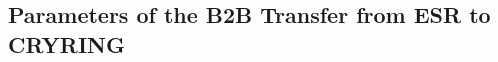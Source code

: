 \begin{longtable*}{ | c | c | c | c | }
    \end{longtable*}
 
 


  
\subsection{Parameters of the B2B Transfer from ESR to CRYRING}
\label{tab:ESRtoCRYRING}


